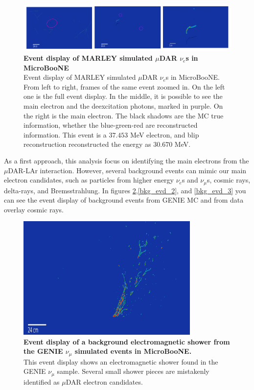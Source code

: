 \begin{figure}[h!]
    \centering
    \includegraphics[width=\textwidth]{Figures/signal_evd_3.jpeg}
    \caption[Event display of MARLEY simulated $\mu$DAR $\nu_e$s in MicroBooNE]{{\textbf{Event display of MARLEY simulated $\mu$DAR $\nu_e$s in MicroBooNE}}\\ Event display of MARLEY simulated $\mu$DAR $\nu_e$s in MicroBooNE. From left to right, frames of the same event zoomed in. On the left one is the full event display. In the middle, it is possible to see the main electron and the deexcitation photons, marked in purple. On the right is the main electron. The black shadows are the MC true information, whether the blue-green-red are reconstructed information. This event is a $37.453$ MeV electron, and blip reconstruction reconstructed the energy as $30.670$ MeV.}
 \label{signal_evd_3}
\end{figure}


As a first approach, this analysis focus on identifying the main electrons from the $\mu$DAR-LAr interaction. However, several background events can mimic our main electron candidates, such as particles from higher energy $\nu_e$s and $\nu_{\mu}$s, cosmic rays, delta-rays, and Bremsstrahlung. In figures \ref{bkg_evd_1},\ref{bkg_evd_2}, and \ref{bkg_evd_3} you can see the event display of background events from GENIE MC and from data overlay cosmic rays.

\begin{figure}[h!]
    \centering
    \includegraphics[width=90mm]{Figures/shower_evd_1.png}
    \caption[Event display of a background electromagnetic shower from the GENIE $\nu_{\mu}$ simulated events in MicroBooNE.]{{\textbf{Event display of a background electromagnetic shower from the GENIE $\nu_{\mu}$ simulated events in MicroBooNE.}}\\ This event display shows an electromagnetic shower found in the GENIE $\nu_{\mu}$ sample. Several small shower pieces are mistakenly identified as $\mu$DAR electron candidates.}
    \label{bkg_evd_1}
\end{figure}

